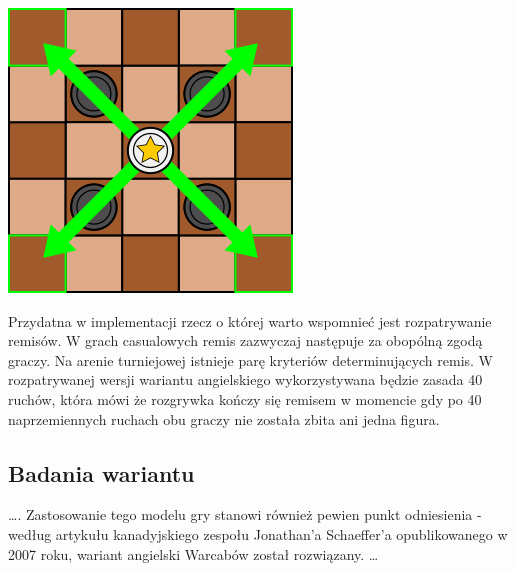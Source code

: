         \includegraphics[scale=.6]{graphics/warcaby_ruchyDamkaBicia.png}

Przydatna w implementacji rzecz o której warto wspomnieć jest rozpatrywanie remisów. W grach casualowych remis zazwyczaj następuje za obopólną zgodą graczy. Na arenie turniejowej istnieje parę kryteriów determinujących remis. W rozpatrywanej wersji wariantu angielskiego wykorzystywana będzie zasada 40 ruchów, która mówi że rozgrywka kończy się remisem w momencie gdy po 40 naprzemiennych ruchach obu graczy nie została zbita ani jedna figura.

\subsection{Badania wariantu}

{\color{dgray}
\ldots . Zastosowanie tego modelu gry stanowi również pewien punkt odniesienia - według artykułu kanadyjskiego zespołu Jonathan'a Schaeffer'a opublikowanego w 2007 roku, wariant angielski Warcabów został rozwiązany. \ldots
}



